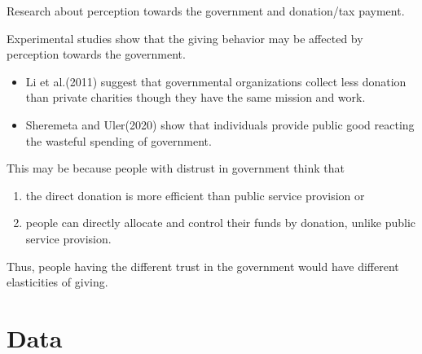\documentclass[
  ignorenonframetext,
]{beamer}
\providecommand{\tightlist}{%
  \setlength{\itemsep}{0pt}\setlength{\parskip}{0pt}}
\begin{document}
\begin{frame}{Research about perception towards the government and
donation/tax payment.}
\protect\hypertarget{research-about-perception-towards-the-government-and-donationtax-payment.}{}

Experimental studies show that the giving behavior may be affected by
perception towards the government.

\begin{itemize}
\tightlist
\item
  Li et al.(2011) suggest that governmental organizations collect less
  donation than private charities though they have the same mission and
  work.
\item
  Sheremeta and Uler(2020) show that individuals provide public good
  reacting the wasteful spending of government.
\end{itemize}

This may be because people with distrust in government think that

\begin{enumerate}
\tightlist
\item
  the direct donation is more efficient than public service provision or
\item
  people can directly allocate and control their funds by donation,
  unlike public service provision.
\end{enumerate}

Thus, people having the different trust in the government would have
different elasticities of giving.

\end{frame}

\hypertarget{data}{%
\section{Data}\label{data}}
\end{document}
